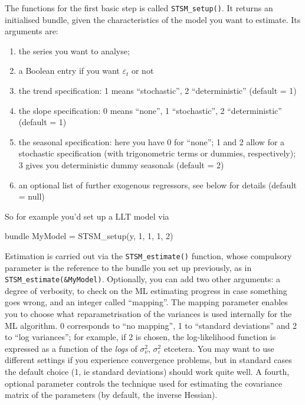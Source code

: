 \documentclass[a4paper,10pt]{article}
\begin{document}
The functions for the first basic step is called
\texttt{STSM\_setup()}. It returns an initialised bundle, given the
characteristics of the model you want to estimate. Its arguments are:

\begin{enumerate}
\item the series you want to analyse;
\item a Boolean entry if you want $\varepsilon_t$ or not
\item the trend specification: 1 means  ``stochastic'', 2 ``deterministic''
  (default = 1)
\item the slope specification: 0 means ``none'', 1 ``stochastic'', 2 ``deterministic''
  (default = 1)
\item the seasonal specification: here you have 0 for ``none''; 1 and
  2 allow for a stochastic specification (with trigonometric terms or
  dummies, respectively); 3 gives you deterministic dummy seasonals (default = 2)
\item an optional list of further exogenous regressors, see below for details
 (default = null) 
\end{enumerate}

So for example you'd set up a LLT model via 
\begin{code}
  bundle MyModel = STSM_setup(y, 1, 1, 1, 2)
\end{code}

Estimation is carried out via the \texttt{STSM\_estimate()} function,
whose compulsory parameter is the reference to the bundle you set up
previously, as in \verb|STSM_estimate(&MyModel)|. Optionally, you can
add two other arguments: a degree of verbosity, to check on the ML
estimating progress in case something goes wrong, and an integer
called ``mapping''. The mapping parameter enables you to choose what
reparametrisation of the variances is used internally for the ML
algorithm. 0 corresponds to ``no mapping'', 1 to ``standard
deviations'' and 2 to ``log variances''; for example, if 2 is chosen,
the log-likelihood function is expressed as a function of the
\emph{logs} of $\sigma^2_{\nu}$, $\sigma^2_{\varepsilon}$
etcetera. You may want to use different settings if you experience
convergence problems, but in standard cases the default choice (1, ie
standard deviations) should work quite well. A fourth, optional
parameter controls the technique used for estimating the covariance
matrix of the parameters (by default, the inverse Hessian).
\end{document}
